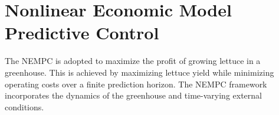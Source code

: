 \documentclass[conference]{IEEEtran}
\newcommand{\ui}[2]{#1_{\mathrm{#2}}}
\newcommand{\coo}{\ensuremath{\mathrm{CO_2}}}
\begin{document}













\section{Nonlinear Economic Model Predictive Control}\label{sec:mpc}
The NEMPC is adopted to maximize the profit of growing lettuce in a greenhouse. This is achieved by maximizing lettuce yield while minimizing operating costs over a finite prediction horizon. The NEMPC framework incorporates the dynamics of the greenhouse and time-varying external conditions.
\end{document}
